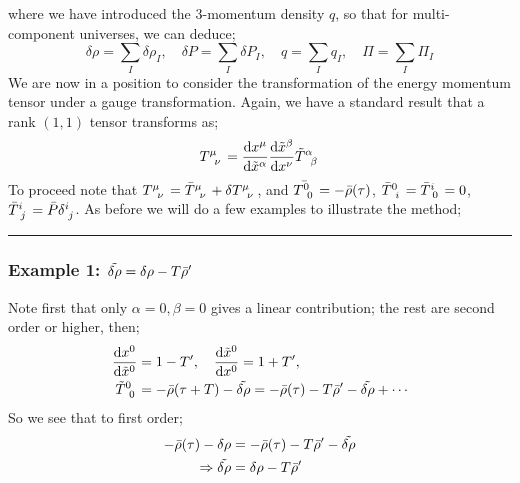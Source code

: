 where we have introduced the $3$-momentum density $q$, so that for multi-component universes, we can deduce;
\begin{equation}
\delta \rho = \sum_{I}{\delta \rho_I}, \quad \delta P = \sum_{I}{\delta P_I}, \quad q = \sum_{I}{q_{I}}, \quad \Pi = \sum_{I}{\Pi_I}
\end{equation}
We are now in a position to consider the transformation of the energy momentum tensor under a gauge transformation. Again, we have a standard result that a rank $(1,1)$ tensor transforms as;
\begin{equation*}
T\indices{^{\mu}_{\nu}} = \frac{\ud x^\mu}{\ud \tilde{x}^\alpha}\frac{\ud \tilde{x}^\beta}{\ud x^\nu}\tilde{T}\indices{^{\alpha}_{\beta}}
\end{equation*}
To proceed note that $T\indices{^{\mu}_{\nu}} = \bar{T}\indices{^{\mu}_{\nu}} + \delta T\indices{^{\mu}_{\nu}}$, and $\bar{T\indices{^{0}_{0}}} = -\bar{\rho}(\tau)$, $\bar{T}\indices{^{0}_{i}} = \bar{T}\indices{^{i}_{0}} = 0$, $\bar{T}\indices{^{i}_{j}} = \bar{P}\delta\indices{^{i}_{j}}$. As before we will do a few examples to illustrate the method;

\paraskip
\hrule
\subsubsection*{Example 1: $\tilde{\delta \rho} = \delta \rho - T \bar{\rho}^{\prime}$}
Note first that only $\alpha = 0, \beta = 0$ gives a linear contribution; the rest are second order or higher, then;
\begin{align*}
\frac{\ud x^0}{\ud \tilde{x}^0} &= 1 - T\pr, \quad \frac{\ud \tilde{x}^0}{\ud x^0} = 1 + T\pr, \\
\tilde{T}\indices{^{0}_{0}} &= -\bar{\rho}(\tau + T) - \tilde{\delta \rho} = -\bar{\rho}(\tau) - T \bar{\rho}\pr - \tilde{\delta \rho} + \cdots
\end{align*}
So we see that to first order;
\begin{align*}
-\bar{\rho}(\tau) - \delta \rho &= -\bar{\rho}(\tau) - T\bar{\rho}^{\prime} - \tilde{\delta \rho} \\
\Rightarrow \tilde{\delta \rho} &= \delta \rho - T \bar{\rho}^{\prime}
\end{align*}
